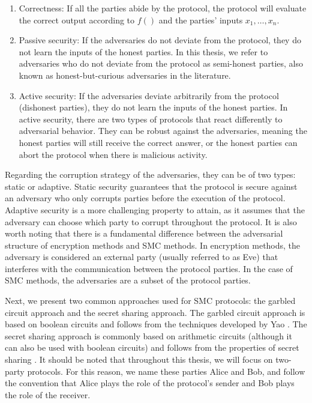 \begin{enumerate}
\item Correctness: If all the parties abide by the protocol, the protocol will evaluate the correct output according to $f()$ and the parties' inputs $x_1, \ldots, x_n$.

\item Passive security: If the adversaries do not deviate from the protocol, they do not learn the inputs of the honest parties. In this thesis, we refer to adversaries who do not deviate from the protocol as semi-honest parties, also known as honest-but-curious adversaries in the literature.

\item Active security: If the adversaries deviate arbitrarily from the protocol (dishonest parties), they do not learn the inputs of the honest parties. In active security, there are two types of protocols that react differently to adversarial behavior. They can be robust against the adversaries, meaning the honest parties will still receive the correct answer, or the honest parties can abort the protocol when there is malicious activity.
\end{enumerate}

Regarding the corruption strategy of the adversaries, they can be of two types: static or adaptive. Static security guarantees that the protocol is secure against an adversary who only corrupts parties before the execution of the protocol. Adaptive security is a more challenging property to attain, as it assumes that the adversary can choose which party to corrupt throughout the protocol. It is also worth noting that there is a fundamental difference between the adversarial structure of encryption methods and SMC methods. In encryption methods, the adversary is considered an external party (usually referred to as Eve) that interferes with the communication between the protocol parties. In the case of SMC methods, the adversaries are a subset of the protocol parties.

Next, we present two common approaches used for SMC protocols: the garbled circuit approach and the secret sharing approach. The garbled circuit approach is based on boolean circuits and follows from the techniques developed by Yao \cite{Yao82}. The secret sharing approach is commonly based on arithmetic circuits (although it can also be used with boolean circuits) and follows from the properties of secret sharing \cite{BGW88, CCD88}. It should be noted that throughout this thesis, we will focus on two-party protocols. For this reason, we name these parties Alice and Bob, and follow the convention that Alice plays the role of the protocol's sender and Bob plays the role of the receiver.

